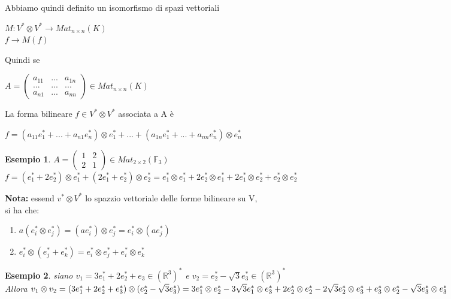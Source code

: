 \documentclass[a4paper,12pt]{article}
\theoremstyle{def}
\theoremstyle{prop}
\theoremstyle{esempio}
\newtheorem*{example}{Esempio}
\theoremstyle{dimostrazione}
\theoremstyle{teo}
\theoremstyle{osservazione}
\begin{document}
Abbiamo quindi definito un isomorfismo di spazi vettoriali
\begin{center}
	\(M: V^* \otimes V^* \rightarrow Mat_{n \times n}(K)\)\\
	\(f \rightarrow M(f)\)
\end{center}
Quindi se
\begin{center}
	\(A = \begin{pmatrix}
		a_{11} & ... & a_{1n} \\
		...    & ... & ...    \\
		a_{n1} & ... & a_{nn}
	\end{pmatrix} \in Mat_{n \times n}(K)\)
\end{center}
La forma bilineare \(f \in V^* \otimes V^*\) associata a A è
\begin{center}
	\(f = (a_{11} e_1^* + ... + a_{n1}e_n^*) \otimes e_1^* + ... + (a_{1n} e_1^* + ... + a_{nn}e_n^*) \otimes e_n^*\)
\end{center}
\begin{example}
	\(A = \begin{pmatrix}
		1 & 2  \\
		2 & 1
	\end{pmatrix} \in Mat_{2 \times 2}(\mathbb{F}_3)\)\\
	\(f = (e_1^* + 2e_2^*) \otimes e_1^* + (2e_1^* + e_2^*) \otimes e_2^* = e_1^* \otimes e_1^* + 2 e_2^* \otimes e_1^* + 2e_1^* \otimes e_2^* + e_2^* \otimes e_2^*\)
\end{example}

\textbf{Nota:} essend \(v^* \otimes V^*\) lo spazzio vettoriale delle forme bilineare su V,\\
si ha che:
\begin{enumerate}
	\item \(a(e_i^* \otimes e_j^*) = (a e_i^*) \otimes e_j^* = e_i^* \otimes (ae_j^*)\)
	\item \(e_i^* \otimes (e_j^* + e_k^*) = e_i^* \otimes e_j^* + e_i^* \otimes e_k^*\)
\end{enumerate}

\begin{example}
	siano \(v_1 = 3e_1^* + 2e_2^* + e_3 \in (\mathbb{R}^3)^*\) e \(v_2 = e_2^* - \sqrt{3} e_3^* \in (\mathbb{R}^3)^*\)\\
	Allora \(v_1 \otimes v_2 = (3e_1^* + 2e_2^* + e_3^*) \otimes (e_2^* - \sqrt{3} e_3^*) =\\
	3e_1^* \otimes e_2^* - 3\sqrt{3} e_1^* \otimes e_3^* + 2e_2^* \otimes e_2^* - 2\sqrt{3} e_2^* \otimes e_3^* + e_3^* \otimes e_2^* - \sqrt{3} e_3^* \otimes e_3^*\)
\end{example}
\end{document}

